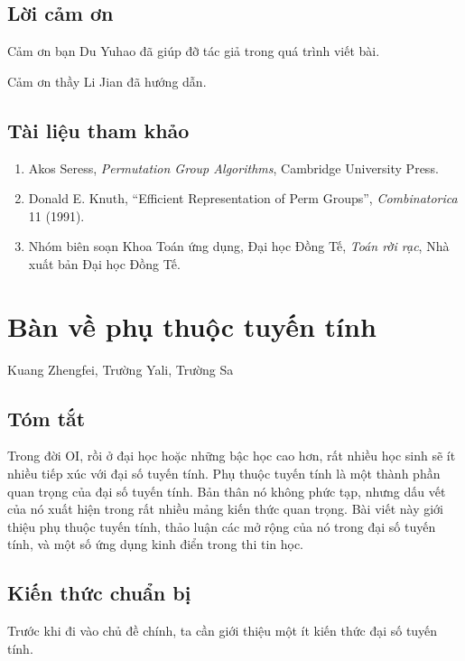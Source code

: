 \documentclass[11pt]{article}
\begin{document}
\subsection{Lời cảm ơn}

Cảm ơn bạn Du Yuhao đã giúp đỡ tác giả trong quá trình viết bài.

Cảm ơn thầy Li Jian đã hướng dẫn.

\subsection*{Tài liệu tham khảo}

\begin{enumerate}
  \item Akos Seress, \emph{Permutation Group Algorithms}, Cambridge University
  Press.
  \item Donald E. Knuth, ``Efficient Representation of Perm Groups'',
  \emph{Combinatorica} 11 (1991).
  \item Nhóm biên soạn Khoa Toán ứng dụng, Đại học Đồng Tế, \emph{Toán rời
  rạc}, Nhà xuất bản Đại học Đồng Tế.
\end{enumerate}

\section{Bàn về phụ thuộc tuyến tính}

\begin{center}
Kuang Zhengfei, Trường Yali, Trường Sa
\end{center}

\subsection*{Tóm tắt}

Trong đời OI, rồi ở đại học hoặc những bậc học cao hơn, rất nhiều học sinh sẽ ít
nhiều tiếp xúc với đại số tuyến tính. Phụ thuộc tuyến tính là một thành phần
quan trọng của đại số tuyến tính. Bản thân nó không phức tạp, nhưng dấu vết của
nó xuất hiện trong rất nhiều mảng kiến thức quan trọng. Bài viết này giới thiệu
phụ thuộc tuyến tính, thảo luận các mở rộng của nó trong đại số tuyến tính, và
một số ứng dụng kinh điển trong thi tin học.

\subsection{Kiến thức chuẩn bị}

Trước khi đi vào chủ đề chính, ta cần giới thiệu một ít kiến thức đại số tuyến
tính.
\end{document}

